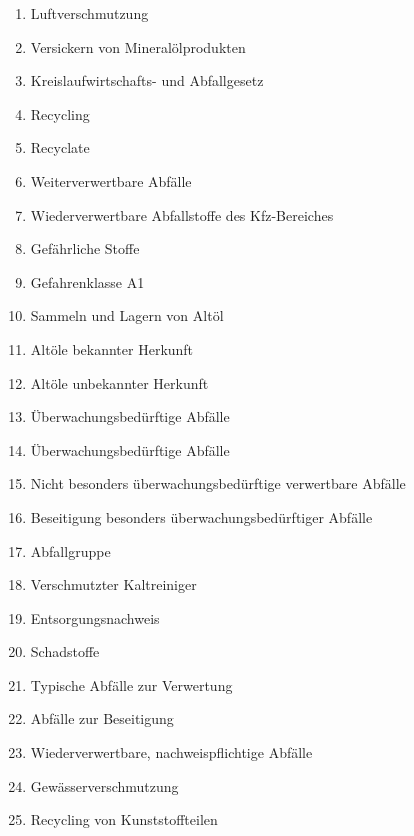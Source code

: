 \begin{enumerate}
\item
  Luftverschmutzung\\
\item
  Versickern von Mineralölprodukten\\
\item
  Kreislaufwirtschafts- und Abfallgesetz\\
\item
  Recycling\\
\item
  Recyclate\\
\item
  Weiterverwertbare Abfälle\\
\item
  Wiederverwertbare Abfallstoffe des Kfz-Bereiches\\
\item
  Gefährliche Stoffe\\
\item
  Gefahrenklasse A1\\
\item
  Sammeln und Lagern von Altöl\\
\item
  Altöle bekannter Herkunft\\
\item
  Altöle unbekannter Herkunft\\
\item
  Überwachungsbedürftige Abfälle\\
\item
  Überwachungsbedürftige Abfälle\\
\item
  Nicht besonders überwachungsbedürftige verwertbare Abfälle\\
\item
  Beseitigung besonders überwachungsbedürftiger Abfälle\\
\item
  Abfallgruppe\\
\item
  Verschmutzter Kaltreiniger\\
\item
  Entsorgungsnachweis\\
\item
  Schadstoffe\\
\item
  Typische Abfälle zur Verwertung\\
\item
  Abfälle zur Beseitigung\\
\item
  Wiederverwertbare, nachweispflichtige Abfälle\\
\item
  Gewässerverschmutzung\\
\item
  Recycling von Kunststoffteilen
\end{enumerate}

